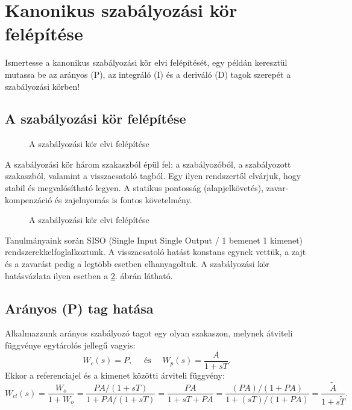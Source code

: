 \section{Kanonikus szabályozási kör felépítése}

\begin{about}
  Ismertesse a kanonikus szabályozási kör elvi felépítését, egy példán
  keresztül mutassa be az arányos (P), az integráló (I) és a deriváló (D) tagok
  szerepét a szabályozási körben!
\end{about}

\subsection{A szabályozási kör felépítése}

\begin{figure}[htb]
  \centering
  
  \caption{A szabályozási kör elvi felépítése}
  \label{fig:control-loop-text}
\end{figure}

A szabályozási kör három szakaszból épül fel: a szabályozóból, a szabályozott
szakaszból, valamint a visszacsatoló tagból.
Egy ilyen rendszertől elvárjuk, hogy stabil és megvalósítható legyen.
A statikus pontosság (alapjelkövetés), zavar-kompenzáció és zajelnyomás is
fontos követelmény.

\begin{figure}[htb]
  \centering
  
  \caption{A szabályozási kör elvi felépítése}
  \label{fig:control-loop-basic}
\end{figure}

Tanulmányaink során SISO (Single Input Single Output / 1 bemenet 1 kimenet)
rendszerekkelfoglalkoztunk. A visszacsatoló hatást konstans egynek vettük, a
zajt és a zavarást pedig a legtöbb esetben elhanyagoltuk. A szabályozási kör
hatásvázlata ilyen esetben a \ref{fig:control-loop-basic}. ábrán látható.

\subsection{Arányos (P) tag hatása}

Alkalmazzunk arányos szabályozó tagot egy olyan szakaszon, melynek átviteli
függvénye egytárolós jellegű vagyis:
\begin{equation}
  W_c(s) = P,
  \quad \text{ és } \quad
  W_p(s) = \frac{A}{1 + sT}
  .
  \label{eq:P-use-CP}
\end{equation}
Ekkor a referenciajel és a kimenet közötti árviteli függvény:
\begin{equation}
  W_{cl}(s)
  = \frac{W_o}{1 + W_o}
  = \frac{PA / (1 + sT)}{1 + PA / (1 + sT)}
  = \frac{PA}{1 + sT + PA}
  = \frac{(PA) / (1 + PA)}{1 + (sT) / (1 + PA)}
  = \frac{\tilde A}{1 + s \tilde T}
  .
  \label{eq:P-use-cl}
\end{equation}

